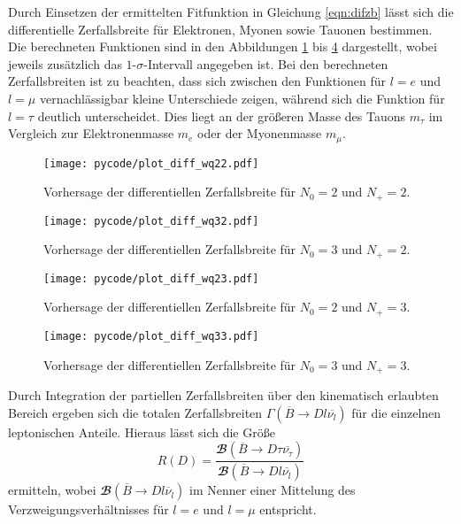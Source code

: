 Durch Einsetzen der ermittelten Fitfunktion in Gleichung \eqref{eqn:difzb} lässt sich die differentielle Zerfallsbreite für Elektronen, Myonen sowie Tauonen bestimmen.
Die berechneten Funktionen sind in den Abbildungen \ref{fig:difwq22} bis \ref{fig:difwq33} dargestellt, wobei jeweils zusätzlich das $\num{1}$-$\sigma$-Intervall angegeben ist.
Bei den berechneten Zerfallsbreiten ist zu beachten, dass sich zwischen den Funktionen für $l = e$ und $l = \mu$ vernachlässigbar kleine Unterschiede zeigen, während sich die Funktion für $l = \tau$ deutlich unterscheidet.
Dies liegt an der größeren Masse des Tauons $m_{\tau}$ im Vergleich zur Elektronenmasse $m_{e}$ oder der Myonenmasse $m_{\mu}$.
\begin{figure}
  \centering
  \texttt{[image: pycode/plot\_diff\_wq22.pdf]}
  \caption{Vorhersage der differentiellen Zerfallsbreite für $N_0 = \num{2}$ und $N_+ = \num{2}$.}
  \label{fig:difwq22}
\end{figure}
\begin{figure}
  \centering
  \texttt{[image: pycode/plot\_diff\_wq32.pdf]}
  \caption{Vorhersage der differentiellen Zerfallsbreite für $N_0 = \num{3}$ und $N_+ = \num{2}$.}
  \label{fig:difwq32}
\end{figure}
\begin{figure}
  \centering
  \texttt{[image: pycode/plot\_diff\_wq23.pdf]}
  \caption{Vorhersage der differentiellen Zerfallsbreite für $N_0 = \num{2}$ und $N_+ = \num{3}$.}
  \label{fig:difwq23}
\end{figure}
\begin{figure}
  \centering
  \texttt{[image: pycode/plot\_diff\_wq33.pdf]}
  \caption{Vorhersage der differentiellen Zerfallsbreite für $N_0 = \num{3}$ und $N_+ = \num{3}$.}
  \label{fig:difwq33}
\end{figure}
Durch Integration der partiellen Zerfallsbreiten über den kinematisch erlaubten Bereich ergeben sich die totalen Zerfallsbreiten $\Gamma \left(\overline{B} \to D l \overline{\nu_l} \right)$ für die einzelnen leptonischen Anteile. \nocite{scipy}
Hieraus lässt sich die Größe
\begin{equation}
  R(D) = \frac{{\mathbfcal{B}}\!\left(\overline{B} \to D \tau \overline{\nu_\tau} \right)}{{\mathbfcal{B}}\!\left(\overline{B} \to D l \overline{\nu_l} \right)}
\end{equation}
ermitteln, wobei ${\mathbfcal{B}} \!\left(\overline{B} \to D l \overline{\nu}_l \right)$ im Nenner einer Mittelung des Verzweigungsverhältnisses für $l = e$ und $l = \mu$ entspricht.
